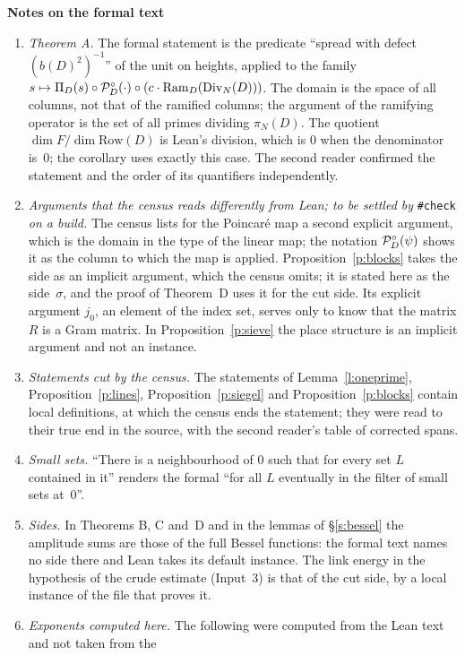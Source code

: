 \documentclass[11pt,a4paper]{article}
\newcommand{\m}[1]{\mbox{$#1$}}        %
\newcommand{\sect}[2]{\refstepcounter{section}\label{#2}\par\addvspace{19pt plus 4pt minus 2pt}\Needspace{7\baselineskip}%
  \noindent\llap{{\fontsize{13.2}{16}\selectfont\bfseries\color{inkfaint}\thesection}\hspace{9pt}}%
  {\fontsize{13.2}{16}\selectfont\bfseries\color{ink}#1}\par\nopagebreak\vspace{-1pt}}
\theoremstyle{plainx}
\theoremstyle{uprightx}
\newcommand{\Row}[1]{\mathrm{Row}(#1)}              %
\newcommand{\gpt}[2]{\Pi_{#1}(#2)}                  %
\newcommand{\Ram}[2]{\mathrm{Ram}_{#1}(#2)}         %
\newcommand{\DivN}[1]{\mathrm{Div}_{N}(#1)}         %
\begin{document}
\sect{Notes on the formal text}{s:notes}
\begin{enumerate}[leftmargin=1.6em,itemsep=3pt]
\item \emph{Theorem A.} The formal statement is the predicate ``spread with defect \m{(b(D)^2)^{-1}}'' of the
unit on heights, applied to the family
$s\mapsto\gpt{D}{s}\circ\Poin{D}{\cdot}\circ(c\cdot\Ram{D}{\DivN{D}})$. The
domain is the space of all columns, not that of the ramified columns; the argument of the ramifying operator
is the set of all primes dividing \m{\pi_N(D)}. The quotient \m{\dim F/\dim\Row{D}} is Lean's division, which
is $0$ when the denominator is~$0$; the corollary uses exactly this case. The second reader confirmed the
statement and the order of its quantifiers independently.
\item \emph{Arguments that the census reads differently from Lean; to be settled by} \texttt{\#check}
\emph{on a build.} The census lists for the Poincaré map a second explicit argument, which is the domain in the
type of the linear map; the notation \m{\Poin{D}{\psi}} shows it as the column to which the map is applied.
Proposition~\ref{p:blocks} takes the side as an implicit argument, which the census omits; it is stated here as
the side~$\sigma$, and the proof of Theorem~D uses it for the cut side. Its explicit argument $j_0$, an element
of the index set, serves only to know that the matrix $R$ is a Gram matrix. In Proposition~\ref{p:sieve} the
place structure is an implicit argument and not an instance.
\item \emph{Statements cut by the census.} The statements of Lemma~\ref{l:oneprime}, Proposition~\ref{p:lines},
Proposition~\ref{p:siegel} and Proposition~\ref{p:blocks} contain local definitions, at which the census ends
the statement; they were read to their true end in the source, with the second reader's table of corrected
spans.
\item \emph{Small sets.} ``There is a neighbourhood of $0$ such that for every set $L$ contained in it''
renders the formal ``for all $L$ eventually in the filter of small sets at~$0$''.
\item \emph{Sides.} In Theorems B, C and~D and in the lemmas of §\ref{s:bessel} the amplitude sums are those of
the full Bessel functions: the formal text names no side there and Lean takes its default instance. The link
energy in the hypothesis of the crude estimate (Input~3) is that of the cut side, by a local instance of the
file that proves it.
\item \emph{Exponents computed here.} The following were computed from the Lean text and not taken from the

\end{enumerate}
\end{document}
